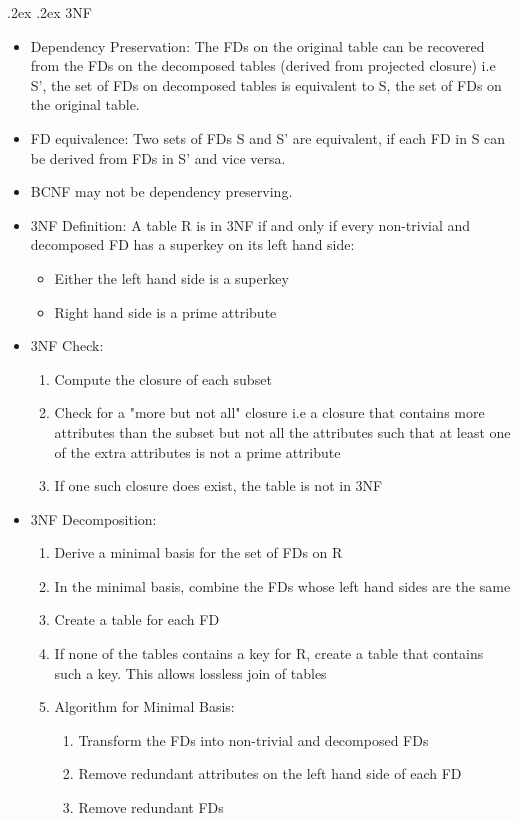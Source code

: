 \documentclass[10pt,landscape,a4paper]{scrartcl}
\makeatletter
\renewcommand{\section}{\@startsection{section}{1}{0mm}%
  {.2ex}%
  {.2ex}%
{\color{myblue}\sffamily\small\bfseries}}
\makeatother
\begin{document}
\begin{multicols*}{4}
  \section{3NF}
   \begin{itemize}
       \item Dependency Preservation: The FDs on the original table can be recovered from the FDs on the decomposed tables (derived from projected closure) i.e S', the set of FDs on decomposed tables is equivalent to S, the set of FDs on the original table.
       \item FD equivalence: Two sets of FDs S and S' are equivalent, if each FD in S can be derived from FDs in S' and vice versa.
       \item BCNF may not be dependency preserving.
       \item 3NF Definition: A table R is in 3NF if and only if every non-trivial and decomposed FD has a superkey on its left hand side:
       \begin{itemize}
           \item Either the left hand side is a superkey
           \item Right hand side is a prime attribute
       \end{itemize}
       \item 3NF Check:
           \begin{enumerate}
                \item Compute the closure of each subset
                \item Check for a "more but not all" closure i.e a closure that contains more attributes than the subset but not all the attributes such that at least one of the extra attributes is not a prime attribute
                \item If one such closure does exist, the table is not in 3NF
          \end{enumerate}
       \item 3NF Decomposition:
        \begin{enumerate}
            \item Derive a minimal basis for the set of FDs on R
            \item In the minimal basis, combine the FDs whose left hand sides are the same
            \item Create a table for each FD
            \item If none of the tables contains a key for R, create a table that contains such a key. This allows lossless join of tables 
        \item Algorithm for Minimal Basis:
        \begin{enumerate}
            \item Transform the FDs into non-trivial and decomposed FDs
            \item Remove redundant attributes on the left hand side of each FD
            \item Remove redundant FDs
        \end{enumerate}
        \end{enumerate}
   \end{itemize}
\end{multicols*}
\end{document}
